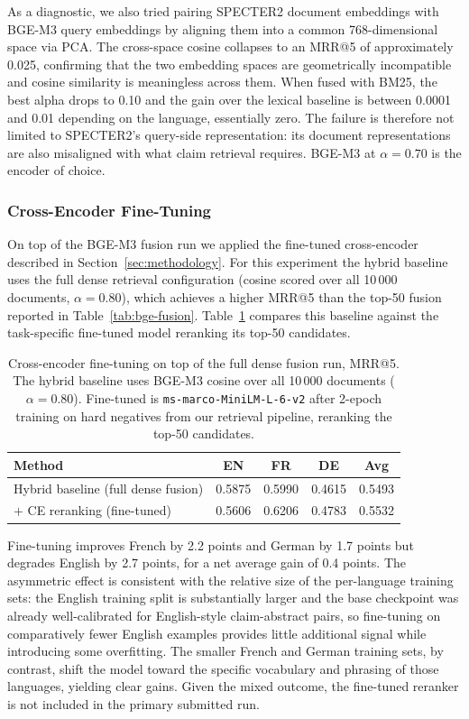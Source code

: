 As a diagnostic, we also tried pairing SPECTER2 document embeddings with BGE-M3 query embeddings by aligning them into a common 768-dimensional space via PCA. The cross-space cosine collapses to an MRR@5 of approximately 0.025, confirming that the two embedding spaces are geometrically incompatible and cosine similarity is meaningless across them. When fused with BM25, the best alpha drops to 0.10 and the gain over the lexical baseline is between 0.0001 and 0.01 depending on the language, essentially zero. The failure is therefore not limited to SPECTER2's query-side representation: its document representations are also misaligned with what claim retrieval requires. BGE-M3 at $\alpha{=}0.70$ is the encoder of choice.

\subsubsection{Cross-Encoder Fine-Tuning}
\label{subsubsec:res-ce}

On top of the BGE-M3 fusion run we applied the fine-tuned cross-encoder described in Section~\ref{sec:methodology}. For this experiment the hybrid baseline uses the full dense retrieval configuration (cosine scored over all 10\,000 documents, $\alpha{=}0.80$), which achieves a higher MRR@5 than the top-50 fusion reported in Table~\ref{tab:bge-fusion}. Table~\ref{tab:ce-finetune} compares this baseline against the task-specific fine-tuned model reranking its top-50 candidates.

\begin{table}[!ht]
    \caption{Cross-encoder fine-tuning on top of the full dense fusion run, MRR@5. The hybrid baseline uses BGE-M3 cosine over all 10\,000 documents ($\alpha{=}0.80$). Fine-tuned is \texttt{ms-marco-MiniLM-L-6-v2} after 2-epoch training on hard negatives from our retrieval pipeline, reranking the top-50 candidates.}
    \label{tab:ce-finetune}
    \centering
    \begin{tabular}{lcccc}
        \toprule
        Method & EN & FR & DE & Avg \\
        \midrule
        Hybrid baseline (full dense fusion) & 0.5875 & 0.5990 & 0.4615 & 0.5493 \\
        $+$ CE reranking (fine-tuned)       & 0.5606 & 0.6206 & 0.4783 & 0.5532 \\
        \bottomrule
    \end{tabular}
\end{table}

Fine-tuning improves French by 2.2 points and German by 1.7 points but degrades English by 2.7 points, for a net average gain of 0.4 points. The asymmetric effect is consistent with the relative size of the per-language training sets: the English training split is substantially larger and the base checkpoint was already well-calibrated for English-style claim-abstract pairs, so fine-tuning on comparatively fewer English examples provides little additional signal while introducing some overfitting. The smaller French and German training sets, by contrast, shift the model toward the specific vocabulary and phrasing of those languages, yielding clear gains. Given the mixed outcome, the fine-tuned reranker is not included in the primary submitted run.

